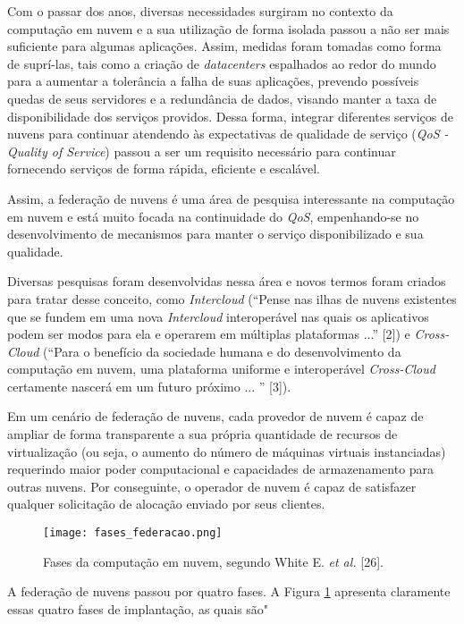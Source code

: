 Com o passar dos anos, diversas necessidades surgiram no contexto da computação em nuvem e a sua utilização de forma isolada passou a não ser mais suficiente para algumas aplicações. Assim, medidas foram tomadas como forma de suprí-las, tais como a criação de \textit{datacenters} espalhados ao redor do mundo para a aumentar a tolerância a falha de suas aplicações, prevendo possíveis quedas de seus servidores e a redundância de dados, visando manter a taxa de disponibilidade dos serviços providos. Dessa forma, integrar diferentes serviços de nuvens para continuar atendendo às expectativas de qualidade de serviço (\textit{QoS - Quality of Service}) passou a ser um requisito necessário para continuar fornecendo serviços de forma rápida, eficiente e escalável. 

Assim, a federação de nuvens é uma área de pesquisa interessante na computação em nuvem e está muito focada na continuidade do \textit{QoS}, empenhando-se no desenvolvimento de mecanismos para manter o serviço disponibilizado e sua qualidade. 

Diversas pesquisas foram desenvolvidas nessa área e novos termos foram criados para tratar desse conceito, como \textit{Intercloud} (``Pense nas ilhas de nuvens existentes que se fundem em uma nova \textit{Intercloud} interoperável nas quais os aplicativos podem ser modos para ela e operarem em múltiplas plataformas ...'' [2]) e \textit{Cross-Cloud} (``Para o benefício da sociedade humana e do desenvolvimento da computação em nuvem, uma plataforma uniforme e interoperável \textit{Cross-Cloud} certamente nascerá em um futuro próximo ... '' [3]).

Em um cenário de federação de nuvens, cada provedor de nuvem é capaz de ampliar de forma transparente a sua própria quantidade de recursos de virtualização (ou seja, o aumento do número de máquinas virtuais instanciadas) requerindo maior poder computacional e capacidades de armazenamento para outras nuvens. Por conseguinte, o operador de nuvem é capaz de satisfazer qualquer solicitação de alocação enviado por seus clientes.

\begin{figure}[H]
	\centering
	\texttt{[image: fases\_federacao.png]}
	\caption{Fases da computação em nuvem, segundo White E. \textit{et al.} [26].}
	\label{fig:federacao_nuvens}
\end{figure}

A federação de nuvens passou por quatro fases. A Figura \ref{fig:federacao_nuvens} apresenta claramente essas quatro fases de implantação, as quais são"

